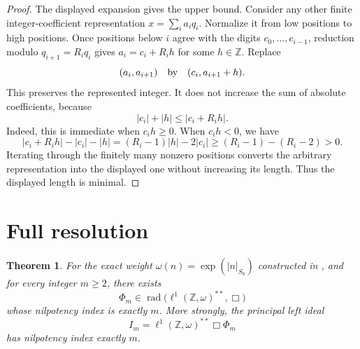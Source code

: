 \documentclass[11pt]{article}
\newtheorem{theorem}{Theorem}
\newcommand{\Z}{\mathbb Z}
\newcommand{\rad}{\operatorname{rad}}
\begin{document}
\begin{proof}
The displayed expansion gives the upper bound.  Consider any other finite
integer-coefficient representation \(x=\sum_i a_iq_i\).  Normalize it from
low positions to high positions.  Once positions below \(i\) agree with the
digits \(c_0,\ldots,c_{i-1}\), reduction modulo
\(q_{i+1}=R_iq_i\) gives
\(a_i=c_i+R_ih\) for some \(h\in\Z\).  Replace
\[
 (a_i,a_{i+1})\quad\hbox{by}\quad(c_i,a_{i+1}+h).
\]
This preserves the represented integer.  It does not increase the sum of
absolute coefficients, because
\[
 |c_i|+|h|\leq |c_i+R_ih|.
\]
Indeed, this is immediate when \(c_i h\geq0\).  When \(c_i h<0\), we have
\[
 |c_i+R_ih|-|c_i|-|h|
 =(R_i-1)|h|-2|c_i|
 \geq (R_i-1)-(R_i-2)>0.
\]
Iterating through the finitely many nonzero positions converts the arbitrary
representation into the displayed one without increasing its length.  Thus
the displayed length is minimal.
\end{proof}

\section{Full resolution}

\begin{theorem}\label{thm:main}
For the exact weight \(\omega(n)=\exp(|n|_{S_0})\) constructed in
\cite{white2018}, and for every integer \(m\geq2\), there exists
\[
 \Phi_m\in\rad\bigl(\ell^1(\Z,\omega)^{**},\Box\bigr)
\]
whose nilpotency index is exactly \(m\).  More strongly, the principal left
ideal
\[
 I_m=\ell^1(\Z,\omega)^{**}\Box\Phi_m
\]
has nilpotency index exactly \(m\).
\end{theorem}
\end{document}
